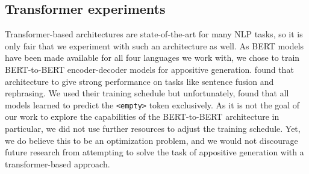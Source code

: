 \subsection{Transformer experiments}
\label{transformer}
Transformer-based architectures are state-of-the-art for many NLP tasks, so it is only fair that we experiment with such an architecture as well. As BERT models \cite{devlin2019bert} have been made available for all four languages we work with, we chose to train BERT-to-BERT encoder-decoder models for appositive generation.  found that architecture to give strong performance on tasks like sentence fusion and rephrasing. We used their training schedule but unfortunately, found that all models learned to predict the \texttt{<empty>} token exclusively. As it is not the goal of our work to explore the capabilities of the BERT-to-BERT architecture in particular, we did not use further resources to adjust the training schedule. Yet, we do believe this to be an optimization problem, and we would not discourage future research from attempting to solve the task of appositive generation with a transformer-based approach.




